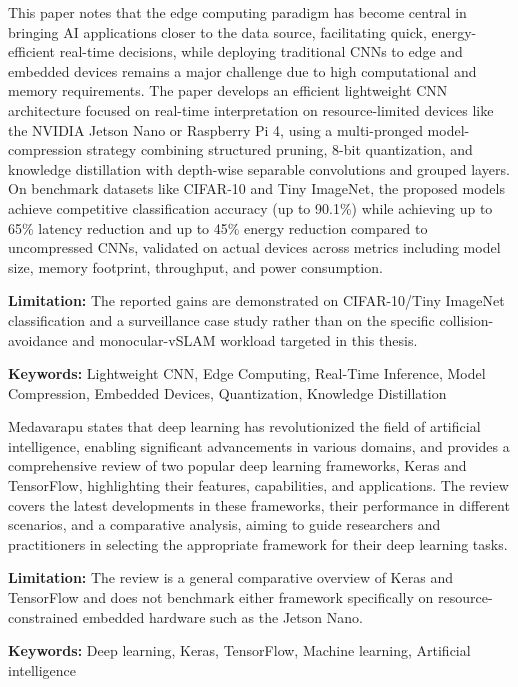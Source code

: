 {
	This paper \cite{chaharborj:2023} notes that the edge computing paradigm has become central in bringing AI applications closer to the data source, facilitating quick, energy-efficient real-time decisions, while deploying traditional CNNs to edge and embedded devices remains a major challenge due to high computational and memory requirements. The paper develops an efficient lightweight CNN architecture focused on real-time interpretation on resource-limited devices like the NVIDIA Jetson Nano or Raspberry Pi 4, using a multi-pronged model-compression strategy combining structured pruning, 8-bit quantization, and knowledge distillation with depth-wise separable convolutions and grouped layers. On benchmark datasets like CIFAR-10 and Tiny ImageNet, the proposed models achieve competitive classification accuracy (up to 90.1\%) while achieving up to 65\% latency reduction and up to 45\% energy reduction compared to uncompressed CNNs, validated on actual devices across metrics including model size, memory footprint, throughput, and power consumption.
	
	\bigskip
	\textbf{Limitation:} The reported gains are demonstrated on CIFAR-10/Tiny ImageNet classification and a surveillance case study rather than on the specific collision-avoidance and monocular-vSLAM workload targeted in this thesis.
	
	\scriptsize{\textbf{Keywords:} Lightweight CNN, Edge Computing, Real-Time Inference, Model Compression, Embedded Devices, Quantization, Knowledge Distillation}
}

{
	Medavarapu \cite{Jsaer:2024} states that deep learning has revolutionized the field of artificial intelligence, enabling significant advancements in various domains, and provides a comprehensive review of two popular deep learning frameworks, Keras and TensorFlow, highlighting their features, capabilities, and applications. The review covers the latest developments in these frameworks, their performance in different scenarios, and a comparative analysis, aiming to guide researchers and practitioners in selecting the appropriate framework for their deep learning tasks.
	
	\bigskip
	\textbf{Limitation:} The review is a general comparative overview of Keras and TensorFlow and does not benchmark either framework specifically on resource-constrained embedded hardware such as the Jetson Nano.
	
	\scriptsize{\textbf{Keywords:} Deep learning, Keras, TensorFlow, Machine learning, Artificial intelligence}
}

